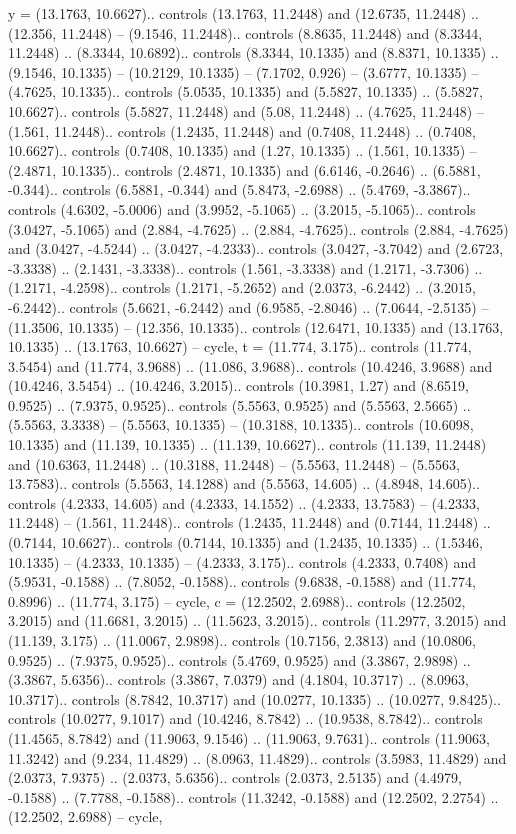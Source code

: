 y = {(13.1763, 10.6627).. controls (13.1763, 11.2448) and (12.6735, 11.2448) .. (12.356, 11.2448) -- (9.1546, 11.2448).. controls (8.8635, 11.2448) and (8.3344, 11.2448) .. (8.3344, 10.6892).. controls (8.3344, 10.1335) and (8.8371, 10.1335) .. (9.1546, 10.1335) -- (10.2129, 10.1335) -- (7.1702, 0.926) -- (3.6777, 10.1335) -- (4.7625, 10.1335).. controls (5.0535, 10.1335) and (5.5827, 10.1335) .. (5.5827, 10.6627).. controls (5.5827, 11.2448) and (5.08, 11.2448) .. (4.7625, 11.2448) -- (1.561, 11.2448).. controls (1.2435, 11.2448) and (0.7408, 11.2448) .. (0.7408, 10.6627).. controls (0.7408, 10.1335) and (1.27, 10.1335) .. (1.561, 10.1335) -- (2.4871, 10.1335).. controls (2.4871, 10.1335) and (6.6146, -0.2646) .. (6.5881, -0.344).. controls (6.5881, -0.344) and (5.8473, -2.6988) .. (5.4769, -3.3867).. controls (4.6302, -5.0006) and (3.9952, -5.1065) .. (3.2015, -5.1065).. controls (3.0427, -5.1065) and (2.884, -4.7625) .. (2.884, -4.7625).. controls (2.884, -4.7625) and (3.0427, -4.5244) .. (3.0427, -4.2333).. controls (3.0427, -3.7042) and (2.6723, -3.3338) .. (2.1431, -3.3338).. controls (1.561, -3.3338) and (1.2171, -3.7306) .. (1.2171, -4.2598).. controls (1.2171, -5.2652) and (2.0373, -6.2442) .. (3.2015, -6.2442).. controls (5.6621, -6.2442) and (6.9585, -2.8046) .. (7.0644, -2.5135) -- (11.3506, 10.1335) -- (12.356, 10.1335).. controls (12.6471, 10.1335) and (13.1763, 10.1335) .. (13.1763, 10.6627) -- cycle},
t = {(11.774, 3.175).. controls (11.774, 3.5454) and (11.774, 3.9688) .. (11.086, 3.9688).. controls (10.4246, 3.9688) and (10.4246, 3.5454) .. (10.4246, 3.2015).. controls (10.3981, 1.27) and (8.6519, 0.9525) .. (7.9375, 0.9525).. controls (5.5563, 0.9525) and (5.5563, 2.5665) .. (5.5563, 3.3338) -- (5.5563, 10.1335) -- (10.3188, 10.1335).. controls (10.6098, 10.1335) and (11.139, 10.1335) .. (11.139, 10.6627).. controls (11.139, 11.2448) and (10.6363, 11.2448) .. (10.3188, 11.2448) -- (5.5563, 11.2448) -- (5.5563, 13.7583).. controls (5.5563, 14.1288) and (5.5563, 14.605) .. (4.8948, 14.605).. controls (4.2333, 14.605) and (4.2333, 14.1552) .. (4.2333, 13.7583) -- (4.2333, 11.2448) -- (1.561, 11.2448).. controls (1.2435, 11.2448) and (0.7144, 11.2448) .. (0.7144, 10.6627).. controls (0.7144, 10.1335) and (1.2435, 10.1335) .. (1.5346, 10.1335) -- (4.2333, 10.1335) -- (4.2333, 3.175).. controls (4.2333, 0.7408) and (5.9531, -0.1588) .. (7.8052, -0.1588).. controls (9.6838, -0.1588) and (11.774, 0.8996) .. (11.774, 3.175) -- cycle},
c = {(12.2502, 2.6988).. controls (12.2502, 3.2015) and (11.6681, 3.2015) .. (11.5623, 3.2015).. controls (11.2977, 3.2015) and (11.139, 3.175) .. (11.0067, 2.9898).. controls (10.7156, 2.3813) and (10.0806, 0.9525) .. (7.9375, 0.9525).. controls (5.4769, 0.9525) and (3.3867, 2.9898) .. (3.3867, 5.6356).. controls (3.3867, 7.0379) and (4.1804, 10.3717) .. (8.0963, 10.3717).. controls (8.7842, 10.3717) and (10.0277, 10.1335) .. (10.0277, 9.8425).. controls (10.0277, 9.1017) and (10.4246, 8.7842) .. (10.9538, 8.7842).. controls (11.4565, 8.7842) and (11.9063, 9.1546) .. (11.9063, 9.7631).. controls (11.9063, 11.3242) and (9.234, 11.4829) .. (8.0963, 11.4829).. controls (3.5983, 11.4829) and (2.0373, 7.9375) .. (2.0373, 5.6356).. controls (2.0373, 2.5135) and (4.4979, -0.1588) .. (7.7788, -0.1588).. controls (11.3242, -0.1588) and (12.2502, 2.2754) .. (12.2502, 2.6988) -- cycle},

